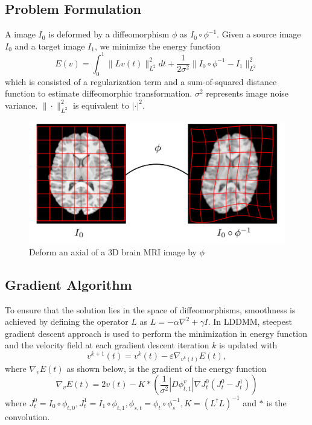 \documentclass{article}
\theoremstyle{definition}
\theoremstyle{plain}
\begin{document}
\subsection{Problem Formulation}
A image $I_0$ is deformed by a diffeomorphism $\phi$ as $I_0\circ\phi^{-1}$. Given a source image $I_0$ and a target image $I_1$, we minimize the energy function
\begin{equation*}
    E(v)=\int^1_0\|Lv(t)\|^2_{L^2}dt+\frac{1}{2\sigma^2}\|I_0\circ\phi^{-1}-I_1\|^2_{L^2}
\end{equation*}
which is consisted of a regularization term and a sum-of-squared distance function to estimate diffeomorphic transformation. $\sigma^2$ represents image noise variance. $\|\cdot\|^2_{L^2}$ is equivalent to $|\cdot|^2$.
\begin{figure}[H]
\centering
\includegraphics[scale=0.25]{figure/LDDMM.png}
\caption{Deform an axial of a 3D brain MRI image by $\phi$}
\end{figure}

\subsection{Gradient Algorithm}
To ensure that the solution lies in the space of diffeomorphisms, smoothness is achieved by defining the operator $L$ as $L=-\alpha\nabla^2+\gamma I$. In LDDMM, steepest gradient descent approach is used to perform the minimization in energy function and the velocity field at each gradient descent iteration $k$ is updated with
\begin{equation*}
    v^{k+1}(t)=v^k(t)-\varepsilon\nabla_{v^k(t)}E(t),
\end{equation*}
where $\nabla_vE(t)$ as shown below, is the gradient of the energy function
\begin{equation}
    \nabla_vE(t)=2v(t)-K*\left(\frac{1}{\sigma^2}|D\phi_{t,1}^v|\nabla J^0_t(J^0_t-J^1_t)\right)
\end{equation}
where $J^0_t=I_0\circ\phi_{t,0}, J^1_t=I_1\circ\phi_{t,1}, \phi_{s,t}=\phi_t\circ\phi^{-1}_s, K=(L^\dagger L)^{-1}$ and $*$ is the convolution.
\end{document}
